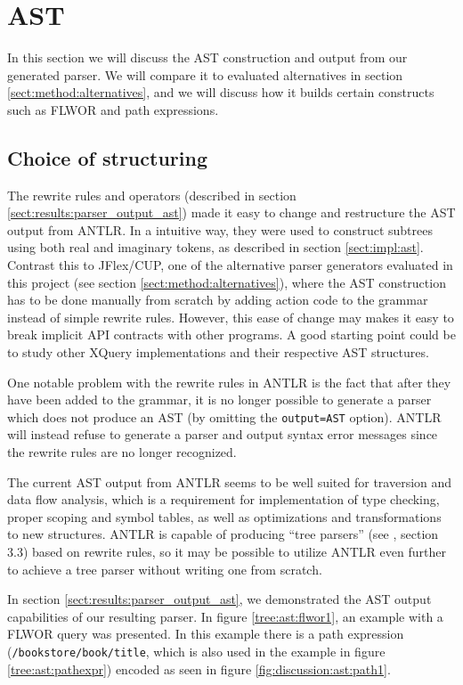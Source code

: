 \section{AST}
\label{sect:discussion:ast}
In this section we will discuss the AST construction and output from our generated
parser. We will compare it to evaluated alternatives in section
\ref{sect:method:alternatives}, and we will discuss how it builds certain
constructs such as FLWOR and path expressions.

\subsection{Choice of structuring}
\label{sect:discussion:ast:structuring}
The rewrite rules and operators (described in section
\ref{sect:results:parser_output_ast}) made it easy to change and restructure the
AST output from ANTLR. In a intuitive way, they were used to construct subtrees
using both real and imaginary tokens, as described in section
\ref{sect:impl:ast}. Contrast this to JFlex/CUP, one of the alternative
parser generators evaluated in this project (see section
\ref{sect:method:alternatives}), where the AST construction has to be done
manually from scratch by adding action code to the grammar instead of simple
rewrite rules. However, this ease of change may makes it easy to break implicit
API contracts with other programs. A good starting point could be to study other
XQuery implementations and their respective AST structures. 

One notable problem with the rewrite rules in ANTLR is the fact that after they
have been added to the grammar, it is no longer possible to generate a parser
which does not produce an AST (by omitting the \verb!output=AST! option). ANTLR will
instead refuse to generate a parser and output syntax error messages since the rewrite
rules are no longer recognized.

The current AST output from ANTLR seems to be well suited for traversion and data
flow analysis, which is a requirement for implementation of type checking,
proper scoping and symbol tables, as well as optimizations and transformations
to new structures. ANTLR is capable of producing ``tree parsers'' (see
\cite{definitiveAntlr}, section 3.3) based on rewrite rules, so it may be
possible to utilize ANTLR even further to achieve a tree
parser without writing one from scratch.

In section \ref{sect:results:parser_output_ast}, we demonstrated the AST output
capabilities of our resulting parser. In figure \ref{tree:ast:flwor1}, an
example with a FLWOR query was presented. In this example there is a path
expression (\verb!/bookstore/book/title!, which is also used in the example in
figure \ref{tree:ast:pathexpr}) encoded as seen in figure
\ref{fig:discussion:ast:path1}. 

